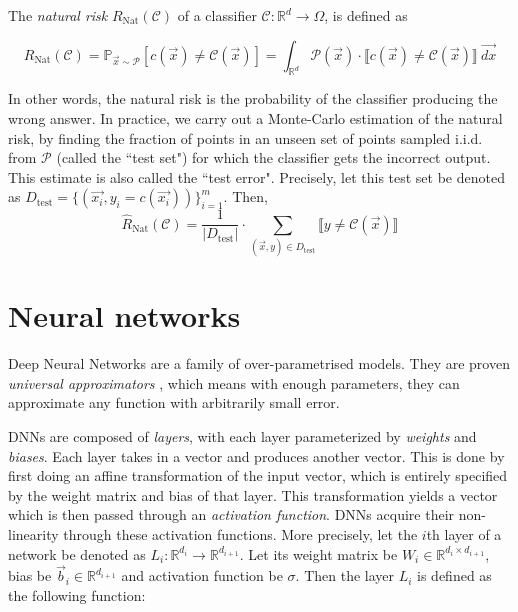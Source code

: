 \documentclass{ociamthesis}
\begin{document}
The \emph{natural risk} $R_{\text{Nat}}(\mathcal{C}) $ of a classifier
$\mathcal{C}: \mathbb{R}^d \to \Omega$, is defined as

\begin{equation}
    R_{\text{Nat}}(\mathcal{C}) = \mathbb{P}_{\vec{x} \sim \mathcal{P}}
    [c(\vec{x}) \neq \mathcal{C}(\vec{x})] = \int_{\mathbb{R}^d} \mathcal{P}(\vec{x})
    \cdot\llbracket c(\vec{x}) \neq \mathcal{C}(\vec{x}) \rrbracket~\vec{dx}
\end{equation}

In other words, the natural risk is the probability of the classifier producing
the wrong answer. In practice, we carry out a Monte-Carlo estimation of the
natural risk, by finding the fraction of points in an unseen set of points
sampled i.i.d. from $\mathcal{P}$ (called the ``test set") for which the
classifier gets the incorrect output. This estimate is also called the ``test
error". Precisely, let this test set be denoted as $D_\text{test} =
\{(\vec{x_i}, y_i=c(\vec{x_i})) \}_{i=1}^m$. Then,
\begin{equation*}
    \hat{R}_{\text{Nat}}(\mathcal{C})
    = \frac{1}{|D_\text{test}|} \cdot \sum_{(\vec{x}, y) \in D_\text{test}} 
    \llbracket y \neq \mathcal{C}(\vec{x}) \rrbracket
\end{equation*}

\section{Neural networks}

Deep Neural Networks are a family of over-parametrised models. They are proven
\emph{universal approximators} \citep{hornik1989multilayer}, which means with
enough parameters, they can approximate any function with arbitrarily small
error.

DNNs are composed of \emph{layers}, with each layer parameterized by
\emph{weights} and \emph{biases}. Each layer takes in a vector and produces
another vector. This is done by first doing an affine transformation of the
input vector, which is entirely specified by the weight matrix and bias of that
layer. This transformation yields a vector which is then passed through an
\emph{activation function}. DNNs acquire their non-linearity through these
activation functions. More precisely, let the $i$th layer of a network be
denoted as $L_i: \mathbb{R}^{d_{i}} \to \mathbb{R}^{d_{i+1}}$. Let its weight
matrix be $W_i \in \mathbb{R}^{d_i \times d_{i+1}}$, bias be $\vec{b}_i \in
\mathbb{R}^{d_{i+1}}$ and activation function be $\sigma$. Then the layer $L_i$
is defined as the following function:
\end{document}
